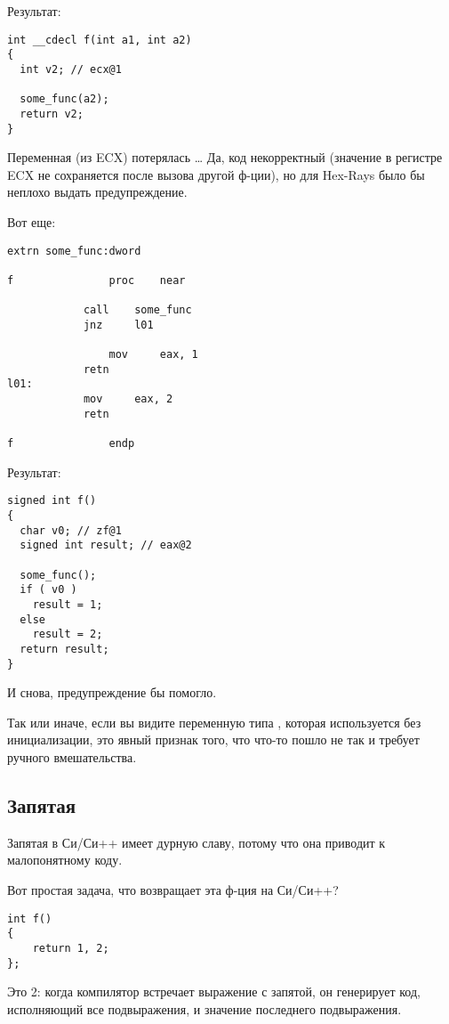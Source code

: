 Результат:

\begin{lstlisting}
int __cdecl f(int a1, int a2)
{
  int v2; // ecx@1

  some_func(a2);
  return v2;
}
\end{lstlisting}

Переменная  (из ECX) потерялась \dots
Да, код некорректный (значение в регистре ECX не сохраняется после вызова другой ф-ции),
но для Hex-Rays было бы неплохо выдать предупреждение.

Вот еще:

\begin{lstlisting}
extrn some_func:dword

f               proc    near

	        call    some_func
        	jnz     l01

                mov     eax, 1
	        retn
l01:
	        mov     eax, 2
        	retn

f               endp
\end{lstlisting}

Результат:

\begin{lstlisting}
signed int f()
{
  char v0; // zf@1
  signed int result; // eax@2

  some_func();
  if ( v0 )
    result = 1;
  else
    result = 2;
  return result;
}
\end{lstlisting}

И снова, предупреждение бы помогло.

Так или иначе, если вы видите переменную типа , которая используется без инициализации, это явный признак того,
что что-то пошло не так и требует ручного вмешательства.

\subsection{Запятая}

Запятая в Си/Си++ имеет дурную славу, потому что она приводит к малопонятному коду.

Вот простая задача, что возвращает эта ф-ция на Си/Си++?

\begin{lstlisting}
int f()
{
	return 1, 2;
};
\end{lstlisting}

Это 2: когда компилятор встречает выражение с запятой, он генерирует код, исполняющий все подвыражения, и 
значение последнего подвыражения.

